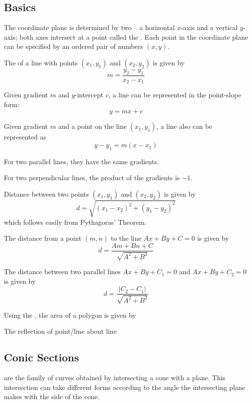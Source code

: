 \subsection{Basics}
The coordinate plane is determined by two  -- a horizontal $x$-axis and a vertical $y$-axis; both axes intersect at a point called the . Each point in the coordinate plane can be specified by an ordered pair of numbers $(x,y)$.

The  of a line with points $(x_1, y_1)$ and $(x_2, y_2)$ is given by
\begin{equation}
m = \frac{y_2-y_1}{x_2-x_1}
\end{equation}

Given gradient $m$ and $y$-intercept $c$, a line can be represented in the point-slope form:
\begin{equation}
y=mx+c
\end{equation}

Given gradient $m$ and a point on the line $(x_1,y_1)$, a line also can be represented as
\begin{equation}
y-y_1=m(x-x_1)
\end{equation}

For two parallel lines, they have the same gradients.

For two perpendicular lines, the product of the gradients is $-1$.

Distance between two points $(x_1,y_1)$ and $(x_2,y_2)$ is given by
\begin{equation}
d=\sqrt{(x_1-x_2)^2+(y_1-y_2)^2}
\end{equation}
which follows easily from Pythagoras' Theorem.

The distance from a point $(m,n)$ to the line $Ax+By+C=0$ is given by
\[ d=\frac{Am+Bn+C}{\sqrt{A^2+B^2}} \]

The distance between two parallel lines $Ax+By+C_1=0$ and $Ax+By+C_2=0$ is given by
\[ d=\frac{|C_2-C_1|}{\sqrt{A^2+B^2}} \]

Using the , the area of a polygon is given by


The reflection of point/line about line

\subsection{Conic Sections}
 are the family of curves obtained by intersecting a cone with a plane. This intersection can take different forms according to the angle the intersecting plane makes with the side of the cone. 

